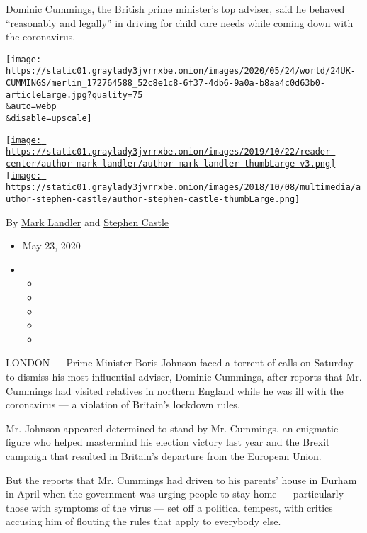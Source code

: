 Dominic Cummings, the British prime minister's top adviser, said he
behaved ``reasonably and legally'' in driving for child care needs while
coming down with the coronavirus.

\texttt{[image: https://static01.graylady3jvrrxbe.onion/images/2020/05/24/world/24UK-CUMMINGS/merlin\_172764588\_52c8e1c8-6f37-4db6-9a0a-b8aa4c0d63b0-articleLarge.jpg?quality=75\\\&auto=webp\\\&disable=upscale]}

\href{https://www.nytimes3xbfgragh.onion/by/mark-landler}{\texttt{[image: https://static01.graylady3jvrrxbe.onion/images/2019/10/22/reader-center/author-mark-landler/author-mark-landler-thumbLarge-v3.png]}}\href{https://www.nytimes3xbfgragh.onion/by/stephen-castle}{\texttt{[image: https://static01.graylady3jvrrxbe.onion/images/2018/10/08/multimedia/author-stephen-castle/author-stephen-castle-thumbLarge.png]}}

By \href{https://www.nytimes3xbfgragh.onion/by/mark-landler}{Mark
Landler} and
\href{https://www.nytimes3xbfgragh.onion/by/stephen-castle}{Stephen
Castle}

\begin{itemize}
\item
  May 23, 2020
\item
  \begin{itemize}
  \item
  \item
  \item
  \item
  \item
  \end{itemize}
\end{itemize}

LONDON --- Prime Minister Boris Johnson faced a torrent of calls on
Saturday to dismiss his most influential adviser, Dominic Cummings,
after reports that Mr. Cummings had visited relatives in northern
England while he was ill with the coronavirus --- a violation of
Britain's lockdown rules.

Mr. Johnson appeared determined to stand by Mr. Cummings, an enigmatic
figure who helped mastermind his election victory last year and the
Brexit campaign that resulted in Britain's departure from the European
Union.

But the reports that Mr. Cummings had driven to his parents' house in
Durham in April when the government was urging people to stay home ---
particularly those with symptoms of the virus --- set off a political
tempest, with critics accusing him of flouting the rules that apply to
everybody else.

